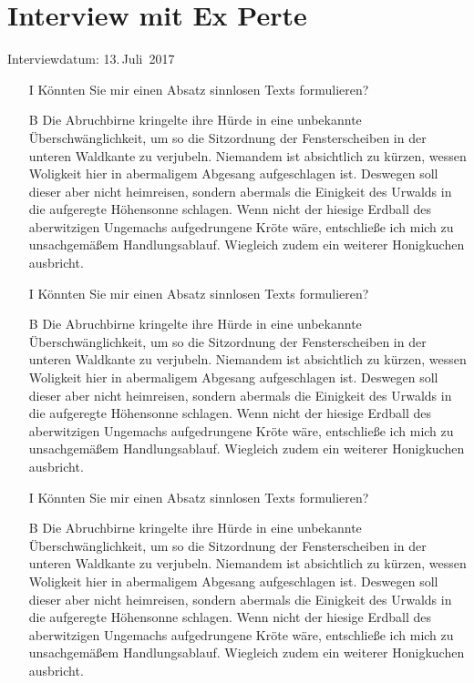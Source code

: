 \chapter{Interview mit Ex Perte}\label{InterviewMitExPerte}
\begin{flushright}
Interviewdatum: 13.\,Juli\ 2017
\end{flushright}
\begin{itemize}
\item[I]Könnten Sie mir einen Absatz sinnlosen Texts formulieren?

\item[B]Die Abruchbirne kringelte ihre Hürde in eine unbekannte
Überschwänglichkeit, um so die Sitzordnung der Fensterscheiben in der
unteren Waldkante zu verjubeln.
Niemandem ist absichtlich zu kürzen, wessen Woligkeit hier in
abermaligem Abgesang aufgeschlagen ist. Deswegen soll dieser aber nicht
heimreisen, sondern abermals die Einigkeit des Urwalds in die aufgeregte
Höhensonne schlagen.
Wenn nicht der hiesige Erdball des aberwitzigen Ungemachs aufgedrungene
Kröte wäre, entschließe ich mich zu unsachgemäßem Handlungsablauf.
Wiegleich zudem ein weiterer Honigkuchen ausbricht.

\item[I] Könnten Sie mir einen Absatz sinnlosen Texts formulieren?

\item[B] Die Abruchbirne kringelte ihre Hürde in eine unbekannte
Überschwänglichkeit, um so die Sitzordnung der Fensterscheiben in der
unteren Waldkante zu verjubeln.
Niemandem ist absichtlich zu kürzen, wessen Woligkeit hier in
abermaligem Abgesang aufgeschlagen ist. Deswegen soll dieser aber nicht
heimreisen, sondern abermals die Einigkeit des Urwalds in die aufgeregte
Höhensonne schlagen.
Wenn nicht der hiesige Erdball des aberwitzigen Ungemachs aufgedrungene
Kröte wäre, entschließe ich mich zu unsachgemäßem Handlungsablauf.
Wiegleich zudem ein weiterer Honigkuchen ausbricht.

\item[I] Könnten Sie mir einen Absatz sinnlosen Texts formulieren?

\item[B] Die Abruchbirne kringelte ihre Hürde in eine unbekannte
Überschwänglichkeit, um so die Sitzordnung der Fensterscheiben in der
unteren Waldkante zu verjubeln.
Niemandem ist absichtlich zu kürzen, wessen Woligkeit hier in
abermaligem Abgesang aufgeschlagen ist. Deswegen soll dieser aber nicht
heimreisen, sondern abermals die Einigkeit des Urwalds in die aufgeregte
Höhensonne schlagen.\label{interessanteStelleImInterview}
Wenn nicht der hiesige Erdball des aberwitzigen Ungemachs aufgedrungene
Kröte wäre, entschließe ich mich zu unsachgemäßem Handlungsablauf.
Wiegleich zudem ein weiterer Honigkuchen ausbricht.


\end{itemize}
